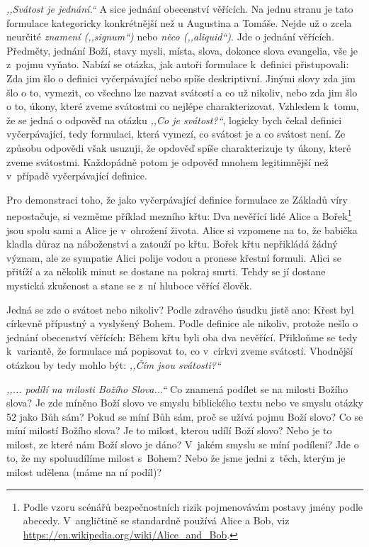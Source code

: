 \textit{,,Svátost je jednání.``} A sice jednání obecenství věřících. Na jednu
stranu je tato formulace kategoricky konkrétnější než u Augustina a Tomáše.
Nejde už o zcela neurčité \textit{znamení (,,signum``)} nebo \textit{něco
(,,aliquid``)}. Jde o jednání věřících. Předměty, jednání Boží, stavy mysli,
místa, slova, dokonce slova evangelia, vše je z~pojmu vyňato. Nabízí se otázka,
jak autoři formulace k~definici přistupovali: Zda jim šlo o definici
vyčerpávající nebo spíše deskriptivní. Jinými slovy zda jim šlo o to, vymezit,
co všechno lze nazvat svátostí a co už nikoliv, nebo zda jim šlo o to, úkony,
které zveme svátostmi co nejlépe charakterizovat. Vzhledem k~tomu, že se jedná o
odpověď na otázku \textit{,,Co je svátost?``}, logicky bych čekal definici
vyčerpávající, tedy formulaci, která vymezí, co svátost je a co svátost není.
Ze způsobu odpovědi však usuzuji, že opdověď spíše charakterizuje ty úkony,
které zveme svátostmi. Každopádně potom je odpověď mnohem legitimnější než
v~případě vyčerpávající definice.

Pro demonstraci toho, že jako vyčerpávající definice formulace ze Základů víry
nepostačuje, si vezměme příklad mezního křtu: Dva nevěřící lidé Alice a
Bořek\footnote{Podle vzoru scénářů bezpečnostních rizik pojmenovávám postavy
jmény podle abecedy. V~angličtině se standardně používá Alice a Bob, viz
\url{https://en.wikipedia.org/wiki/Alice\_and\_Bob}.} jsou spolu sami a Alice je
v~ohrožení života. Alice si vzpomene na to, že babička kladla důraz na
náboženství a zatouží po křtu. Bořek křtu nepřikládá žádný význam, ale ze sympatie
Alici polije vodou a pronese křestní formuli. Alici se přitíží a za několik
minut se dostane na pokraj smrti. Tehdy se jí dostane mystická zkušenost a stane
se z~ní hluboce věřící člověk.

Jedná se zde o svátost nebo nikoliv? Podle zdravého úsudku jistě ano: Křest byl
církevně přípustný a vyslyšený Bohem. Podle definice ale nikoliv, protože nešlo
o jednání obecenství věřících: Během křtu byli oba dva nevěřící.
Přikloňme se tedy k~variantě, že formulace má popisovat to, co v~církvi zveme
svátostí. Vhodnější otázkou by tedy mohlo být: \textit{,,Čím jsou svátosti?{}``}

\textit{,,... podílí na milosti Božího Slova...``} Co znamená podílet se na
milosti Božího slova? Je zde míněno Boží slovo ve smyslu biblického textu nebo
ve smyslu otázky 52 jako Bůh sám? Pokud se míní Bůh sám, proč se užívá pojmu
Boží slovo? Co se míní milostí Božího slova? Je to milost, kterou udílí Boží
slovo? Nebo je to milost, ze které nám Boží slovo je dáno? V~jakém smyslu se
míní podílení? Jde o to, že my spoluudílíme milost s~Bohem? Nebo že jsme jedni
z~těch, kterým je milost udělena (máme na ní podíl)?

